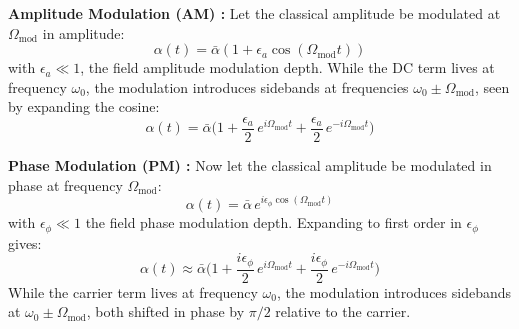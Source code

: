 \noindent \textbf{Amplitude Modulation (AM) :} Let the classical amplitude be modulated at $\Omega_{\text{mod}}$ in amplitude:
\begin{equation}
  \alpha(t) = \bar{\alpha} \left(1 + \epsilon_a \cos(\Omega_{\text{mod}} t)\right)
\end{equation}
with $\epsilon_a \ll 1$, the field amplitude modulation depth. While the DC term lives at frequency $\omega_0$, the modulation introduces sidebands at frequencies $\omega_0 \pm \Omega_{\text{mod}}$, seen by expanding the cosine:
\begin{equation}
  \alpha(t) = \bar{\alpha} \Big( 1 + \frac{\epsilon_a }{2}\, e^{i\Omega_{\text{mod}} t} + \frac{\epsilon_a }{2} \,  e^{-i\Omega_{\text{mod}} t} \Big)
\end{equation}


\noindent \textbf{Phase Modulation (PM) :} Now let the classical amplitude be modulated in phase at frequency $\Omega_{\mathrm{mod}}$:
\begin{equation}
\alpha(t) = \bar{\alpha} \, e^{i \epsilon_{\phi} \cos(\Omega_{\mathrm{mod}} t)}
\label{eq:PM_def}
\end{equation}
with $\epsilon_{\phi} \ll 1$ the field phase modulation depth. Expanding to first order in $\epsilon_{\phi}$ gives:
\begin{equation}
\alpha(t) \approx \bar{\alpha} \Big( 1 + \frac{i \epsilon_{\phi} }{2} \, e^{i\Omega_{\mathrm{mod}} t} + \frac{i \epsilon_{\phi} }{2} \, e^{-i\Omega_{\mathrm{mod}} t} \Big)
\label{eq:PM_expand}
\end{equation}
While the carrier term lives at frequency $\omega_0$, the modulation introduces sidebands at $\omega_0 \pm \Omega_{\mathrm{mod}}$, both shifted in phase by $\pi/2$ relative to the carrier.\\ 

